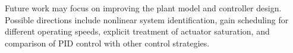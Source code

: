 \documentclass[a4paper,12pt,oneside]{book}
\newcommand{\HeadingR}[1]{{\large\bfseries{#1}}}
\begin{document}
Future work may focus on improving the plant model and controller design. Possible directions include nonlinear system identification, gain scheduling for different operating speeds, explicit treatment of actuator saturation, and comparison of PID control with other control strategies.
\backmatter
\renewcommand\bibname{REFERENCES}
\newpage
{} \label{refs}
\printbibliography[title={REFERENCES}]



\end{document}
